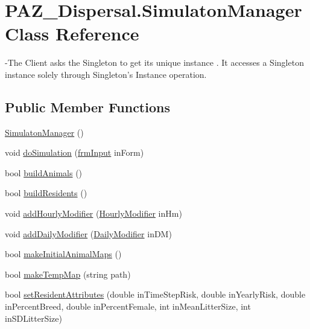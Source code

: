 \hypertarget{class_p_a_z___dispersal_1_1_simulaton_manager}{\section{P\-A\-Z\-\_\-\-Dispersal.\-Simulaton\-Manager Class Reference}
\label{class_p_a_z___dispersal_1_1_simulaton_manager}
}


-\/\-The Client asks the Singleton to get its unique instance . It accesses a Singleton instance solely through Singleton's Instance operation.  


\subsection*{Public Member Functions}
\begin{DoxyCompactItemize}
\item 
\hyperlink{class_p_a_z___dispersal_1_1_simulaton_manager_a7ab698bb3791956ac0849098d0197758}{Simulaton\-Manager} ()
\item 
void \hyperlink{class_p_a_z___dispersal_1_1_simulaton_manager_abfbb0a63ca1e603eb024a5e8246ba8f2}{do\-Simulation} (\hyperlink{class_p_a_z___dispersal_1_1frm_input}{frm\-Input} in\-Form)
\item 
bool \hyperlink{class_p_a_z___dispersal_1_1_simulaton_manager_af1d3411c610aa6ba33afd3e9f521959f}{build\-Animals} ()
\item 
bool \hyperlink{class_p_a_z___dispersal_1_1_simulaton_manager_a394efa5d2387595316f6384261c0ecc9}{build\-Residents} ()
\item 
void \hyperlink{class_p_a_z___dispersal_1_1_simulaton_manager_a6f107bfeffad6bbc891dea45b1014273}{add\-Hourly\-Modifier} (\hyperlink{class_p_a_z___dispersal_1_1_hourly_modifier}{Hourly\-Modifier} in\-Hm)
\item 
void \hyperlink{class_p_a_z___dispersal_1_1_simulaton_manager_acb4df08abf94c7f54fbb8e230ff45152}{add\-Daily\-Modifier} (\hyperlink{class_p_a_z___dispersal_1_1_daily_modifier}{Daily\-Modifier} in\-D\-M)
\item 
bool \hyperlink{class_p_a_z___dispersal_1_1_simulaton_manager_ab05f98e4a38f57839d8b5e63a1d9d855}{make\-Initial\-Animal\-Maps} ()
\item 
bool \hyperlink{class_p_a_z___dispersal_1_1_simulaton_manager_a05f9f403cf934986da84cd4dcf328026}{make\-Temp\-Map} (string path)
\item 
bool \hyperlink{class_p_a_z___dispersal_1_1_simulaton_manager_ad8bfeccd009abeb1ece6fb3a23ad68cb}{set\-Resident\-Attributes} (double in\-Time\-Step\-Risk, double in\-Yearly\-Risk, double in\-Percent\-Breed, double in\-Percent\-Female, int in\-Mean\-Litter\-Size, int in\-S\-D\-Litter\-Size)
\end{DoxyCompactItemize}
